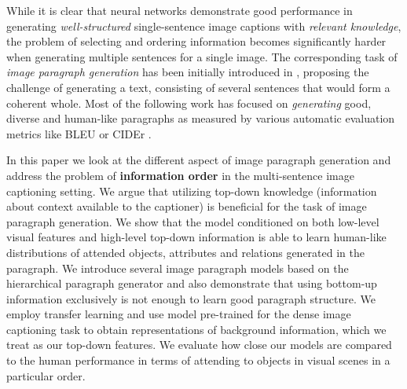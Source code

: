 \documentclass[11pt,a4paper]{article}
\begin{document}

While it is clear that neural networks demonstrate good performance in generating \textit{well-structured} single-sentence image captions with \textit{relevant knowledge}, the problem of selecting and ordering information becomes significantly harder when generating multiple sentences for a single image. The corresponding task of
\textit{image paragraph generation} has been initially introduced in , proposing the challenge of generating a text, consisting of several sentences that would form a coherent whole.
Most of the following work \cite{liang2017recurrent,chatterjee2018diverse,wang2019convolutional} has focused on \textit{generating} good, diverse and human-like paragraphs as measured by various automatic evaluation metrics like BLEU \cite{bleu} or CIDEr \cite{vedantam2014cider}.

In this paper we look at the different aspect of image paragraph generation and address the problem of \textbf{information order} in the multi-sentence image captioning setting. %
We argue that utilizing top-down knowledge (information about context available to the captioner) is beneficial for the task of image paragraph generation.
We show that the model conditioned on both low-level visual features and high-level top-down information is able to learn human-like distributions of attended objects, attributes and relations generated in the paragraph.
We introduce several image paragraph models based on the hierarchical paragraph generator  and also
demonstrate that using bottom-up information exclusively is not enough to learn good paragraph structure.
We employ transfer learning and use model pre-trained for the dense image captioning task \cite{densecap} to obtain representations of background information, which we treat as our top-down features.
We evaluate how close our models are compared to the human performance in terms of attending to objects in visual scenes in a particular order.

\end{document}

